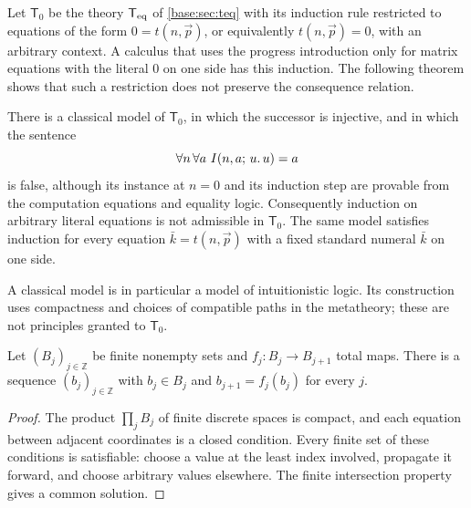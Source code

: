 Let $\mathsf T_0$ be the theory $\mathsf{T}_{\mathrm{eq}}$ of \cref{base:sec:teq} with its induction rule
restricted to equations of the form $0=t(n,\vec p)$, or equivalently $t(n,\vec p)=0$, with
an arbitrary context. A calculus that uses the progress introduction only for matrix
equations with the literal $0$ on one side has this induction. The following theorem shows
that such a restriction does not preserve the consequence relation.

\begin{theorem}\label{ctr:thm:zeroind}
There is a classical model of $\mathsf T_0$, in which the successor is injective, and in
which the sentence
\[
 \forall n\,\forall a\ I(n,a;\,u.\,u)=a
\]
is false, although its instance at $n=0$ and its induction step are provable from the
computation equations and equality logic. Consequently induction on arbitrary literal
equations is not admissible in $\mathsf T_0$. The same model satisfies induction for every
equation $\bar k=t(n,\vec p)$ with a fixed standard numeral $\bar k$ on one side.
\end{theorem}

A classical model is in particular a model of intuitionistic logic. Its construction uses
compactness and choices of compatible paths in the metatheory; these are not principles
granted to $\mathsf T_0$.

\begin{lemma}\label{ctr:lem:path}
Let $(B_j)_{j\in\mathbb Z}$ be finite nonempty sets and $f_j\colon B_j\to B_{j+1}$ total
maps. There is a sequence $(b_j)_{j\in\mathbb Z}$ with $b_j\in B_j$ and
$b_{j+1}=f_j(b_j)$ for every $j$.
\end{lemma}
\begin{proof}
The product $\prod_jB_j$ of finite discrete spaces is compact, and each equation between
adjacent coordinates is a closed condition. Every finite set of these conditions is
satisfiable: choose a value at the least index involved, propagate it forward, and choose
arbitrary values elsewhere. The finite intersection property gives a common solution.
\end{proof}

